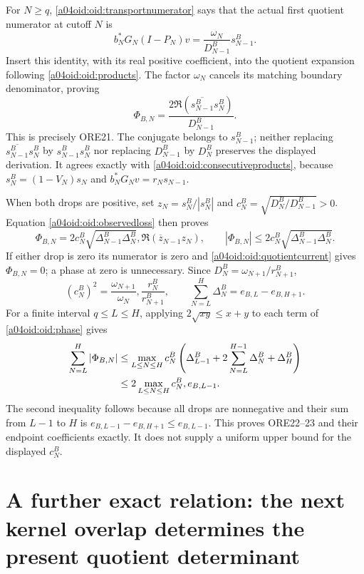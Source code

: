 For $N\ge q$, \eqref{a04oid:oid:transportnumerator} says that the actual
first quotient numerator at cutoff $N$ is
\[
 b_N^*G_N(I-P_N)v
 =\frac{\omega_N}{D_{N-1}^B}s_{N-1}^B.
\]
Insert this identity, with its real positive coefficient, into the
quotient expansion following \eqref{a04oid:oid:products}. The factor
$\omega_N$ cancels its matching boundary denominator, proving
\begin{equation}\label{a04oid:oid:quotientcurrent}
 \boxed{\Phi_{B,N}
 =\frac{2\Re(\overline{s_{N-1}^B}s_N^B)}{D_{N-1}^B}.}
\end{equation}
This is precisely ORE21. The conjugate belongs to $s_{N-1}^B$;
neither replacing $\overline{s_{N-1}^B}s_N^B$ by
$s_{N-1}^Bs_N^B$ nor replacing $D_{N-1}^B$ by $D_N^B$
preserves the displayed derivation. It agrees exactly with
\eqref{a04oid:oid:consecutiveproducts}, because
$s_N^B=(1-V_N)s_N$ and
$b_N^*G_Nv=r_Ns_{N-1}$.

When both drops are positive, set $z_N=s_N^B/|s_N^B|$ and
$c_N^B=\sqrt{D_N^B/D_{N-1}^B}>0$. Equation
\eqref{a04oid:oid:observedloss} then proves
\begin{equation}\label{a04oid:oid:phase}
 \Phi_{B,N}=2c_N^B\sqrt{\Delta_{N-1}^B\Delta_N^B},
 \Re(\overline z_{N-1}z_N),\qquad
 |\Phi_{B,N}|\le2c_N^B\sqrt{\Delta_{N-1}^B\Delta_N^B}.
\end{equation}
If either drop is zero its numerator is zero and
\eqref{a04oid:oid:quotientcurrent} gives $\Phi_{B,N}=0$; a phase at zero
is unnecessary. Since $D_N^B=\omega_{N+1}/r_{N+1}^B$,
\begin{equation}\label{a04oid:oid:cB}
 (c_N^B)^2=\frac{\omega_{N+1}}{\omega_N},
 \frac{r_N^B}{r_{N+1}^B},\qquad
 \sum_{N=L}^H\Delta_N^B=e_{B,L}-e_{B,H+1}.
\end{equation}
For a finite interval $q\le L\le H$, applying
$2\sqrt{xy}\le x+y$ to each term of \eqref{a04oid:oid:phase} gives
\begin{align}\label{a04oid:oid:finitebound}
 \sum_{N=L}^H|\Phi_{B,N}|
 &\le \max_{L\le N\le H}c_N^B
 \left(\Delta_{L-1}^B+2\sum_{N=L}^{H-1}\Delta_N^B+\Delta_H^B\right)
 \notag\\
 &\le 2\max_{L\le N\le H}c_N^B,e_{B,L-1}.
\end{align}
The second inequality follows because all drops are nonnegative and
their sum from $L-1$ to $H$ is $e_{B,L-1}-e_{B,H+1}\le e_{B,L-1}$.
This proves ORE22--23 and their endpoint coefficients exactly. It
does not supply a uniform upper bound for the displayed $c_N^B$.

\section{A further exact relation: the next kernel overlap determines
the present quotient determinant}

